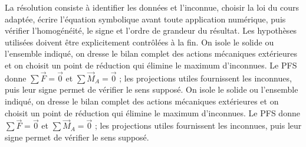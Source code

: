\begin{corrigebox}[Corrigé]
La résolution consiste à identifier les données et l'inconnue, choisir la loi du cours adaptée, écrire l'équation symbolique avant toute application numérique, puis vérifier l'homogénéité, le signe et l'ordre de grandeur du résultat. Les hypothèses utilisées doivent être explicitement contrôlées à la fin.
On isole le solide ou l'ensemble indiqué, on dresse le bilan complet des actions mécaniques extérieures et on choisit un point de réduction qui élimine le maximum d'inconnues. Le PFS donne $\sum\vec F=\vec0$ et $\sum\vec M_A=\vec0$ ; les projections utiles fournissent les inconnues, puis leur signe permet de vérifier le sens supposé.
On isole le solide ou l'ensemble indiqué, on dresse le bilan complet des actions mécaniques extérieures et on choisit un point de réduction qui élimine le maximum d'inconnues. Le PFS donne $\sum\vec F=\vec0$ et $\sum\vec M_A=\vec0$ ; les projections utiles fournissent les inconnues, puis leur signe permet de vérifier le sens supposé.
\end{corrigebox}
